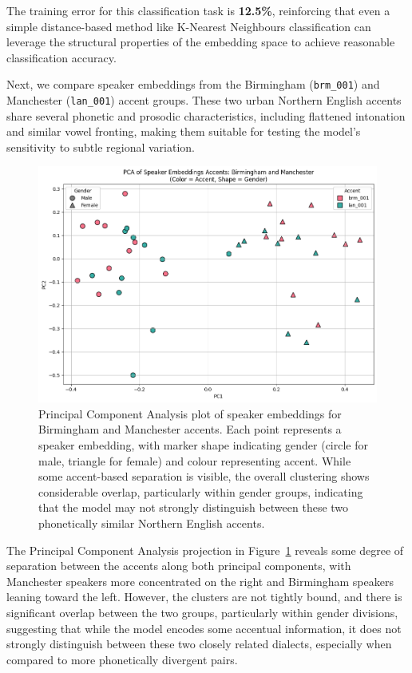 \documentclass[conference]{IEEEtran}
\begin{document}
	The training error for this classification task is \textbf{12.5\%}, reinforcing that even a simple distance-based method like K-Nearest Neighbours classification can leverage the structural properties of the embedding space to achieve reasonable classification accuracy.
	
	\bigskip
	
	
	Next, we compare speaker embeddings from the Birmingham (\texttt{brm\_001}) and Manchester (\texttt{lan\_001}) accent groups. These two urban Northern English accents share several phonetic and prosodic characteristics, including flattened intonation and similar vowel fronting, making them suitable for testing the model's sensitivity to subtle regional variation. 
	
	
	
	\begin{figure}[H]
		\centering
		\includegraphics[width=0.7\linewidth]{img/img-cluster-brm-lan}
		\caption{Principal Component Analysis plot of speaker embeddings for Birmingham and Manchester  accents. Each point represents a speaker embedding, with marker shape indicating gender (circle for male, triangle for female) and colour representing accent. While some accent-based separation is visible, the overall clustering shows considerable overlap, particularly within gender groups, indicating that the model may not strongly distinguish between these two phonetically similar Northern English accents.}
		\label{fig:img-cluster-brm-lan}
	\end{figure}
	
	The Principal Component Analysis projection in Figure~\ref{fig:img-cluster-brm-lan} reveals some degree of separation between the accents along both principal components, with Manchester speakers more concentrated on the right and Birmingham speakers leaning toward the left. However, the clusters are not tightly bound, and there is significant overlap between the two groups, particularly within gender divisions, suggesting that while the model encodes some accentual information, it does not strongly distinguish between these two closely related dialects, especially when compared to more phonetically divergent pairs.
	
\end{document}

